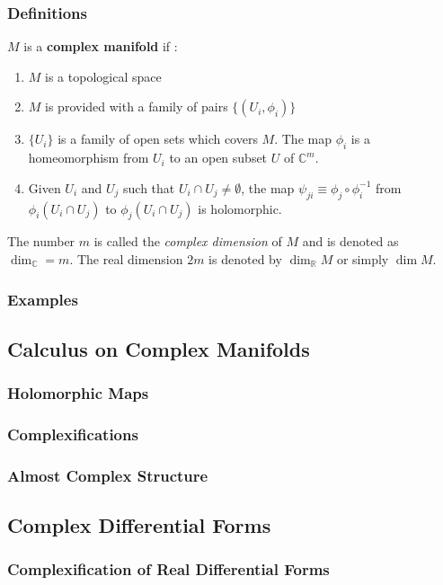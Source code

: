 \documentclass[10pt]{article}
\begin{document}
\subsubsection{Definitions}
\begin{definition}
    $M$ is a \textbf{complex manifold} if :
    \begin{enumerate}
        \item $M$ is a topological space 
        \item $M$ is provided with a family of pairs $\{(U_i,\phi_i)\}$
        \item $\{U_i\}$ is a family of open sets which covers $M$.
              The map $\phi_i$ is a homeomorphism from $U_i$ to an open subset $U$ of $\mathbb{C}^m$.\snm
        \item Given $U_i$ and $U_j$ such that $U_i\cap U_j\neq\emptyset$, the map $\psi_{ji}\equiv\phi_j\circ\phi_i^{-1}$ from $\phi_i(U_i\cap U_j)$ to $\phi_j(U_i\cap U_j)$ is holomorphic.
    \end{enumerate}
\end{definition}
The number $m$ is called the \textit{complex dimension} of $M$ and is denoted as $\dim_{\mathbb{C}}=m$.
The real dimension $2m$ is denoted by $\dim_\mathbb{R} M$ or simply $\dim M$.

\subsubsection{Examples}
\subsection{Calculus on Complex Manifolds}
\subsubsection{Holomorphic Maps}
\subsubsection{Complexifications}
\subsubsection{Almost Complex Structure}
\subsection{Complex Differential Forms}
\subsubsection{Complexification of Real Differential Forms}
\end{document}
